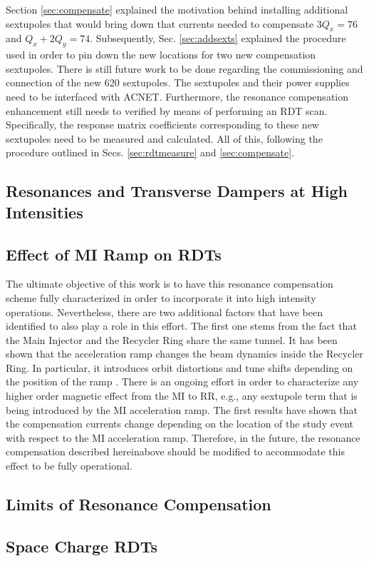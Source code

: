Section \ref{sec:compensate} explained the motivation behind installing additional sextupoles that would bring down that currents needed to compensate $3Q_x=76$ and $Q_x+ 2Q_y = 74$. Subsequently, Sec. \ref{sec:addsexts} explained the procedure used in order to pin down the new locations for two new compensation sextupoles. There is still future work to be done regarding the commissioning and connection of the new 620 sextupoles. The sextupoles and their power supplies need to be interfaced with ACNET. Furthermore, the resonance compensation enhancement still needs to verified by means of performing an RDT scan. Specifically, the response matrix coefficients corresponding to these new sextupoles need to be measured and calculated. All of this, following the procedure outlined in Secs. \ref{sec:rdtmeasure} and \ref{sec:compensate}.

\subsection{Resonances and Transverse Dampers at High Intensities}

\subsection{Effect of MI Ramp on RDTs}

The ultimate objective of this work is to have this resonance compensation scheme fully characterized in order to incorporate it into high intensity operations. Nevertheless, there are two additional factors that have been identified to also play a role in this effort. The first one stems from the fact that the Main Injector and the Recycler Ring share the same tunnel. It has been shown that the acceleration ramp changes the beam dynamics inside the Recycler Ring. In particular, it introduces orbit distortions and tune shifts depending on the position of the ramp \cite{mionrr}. There is an ongoing effort in order to characterize any higher order magnetic effect from the MI to RR, e.g., any sextupole term that is being introduced by the MI acceleration ramp. The first results have shown that the compensation currents change depending on the location of the study event with respect to the MI acceleration ramp. Therefore, in the future, the resonance compensation described hereinabove should be modified to accommodate this effect to be fully operational.

\subsection{Limits of Resonance Compensation}

\subsection{Space Charge RDTs}
\cite{cris1} \cite{cris2}
